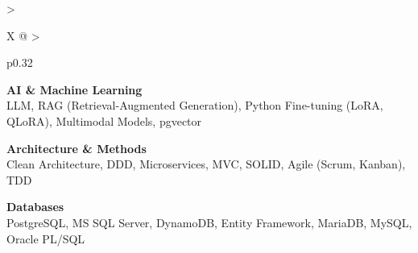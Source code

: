 \documentclass[10pt,a4paper]{article}
\begin{document}
\begin{tabularx}{\textwidth}{
  >{\raggedright\arraybackslash}X
  @{\hspace{1cm}}
  >{\raggedright\arraybackslash}p{0.32\textwidth}
}
\begin{minipage}[t]{\linewidth}
\vspace{4pt}

\textbf{\color{primary} AI \& Machine Learning}\\
\color{darkgray} LLM, RAG (Retrieval-Augmented Generation), Python Fine-tuning (LoRA, QLoRA), Multimodal Models, pgvector

\vspace{4pt}

\textbf{\color{primary} Architecture \& Methods}\\
\color{darkgray} Clean Architecture, DDD, Microservices, MVC, SOLID, Agile (Scrum, Kanban), TDD

\vspace{4pt}

\textbf{\color{primary} Databases}\\
\color{darkgray} PostgreSQL, MS SQL Server, DynamoDB, Entity Framework, MariaDB, MySQL, Oracle PL/SQL

\vspace{4pt}

\end{minipage}
\\
\end{tabularx}
\end{document}
